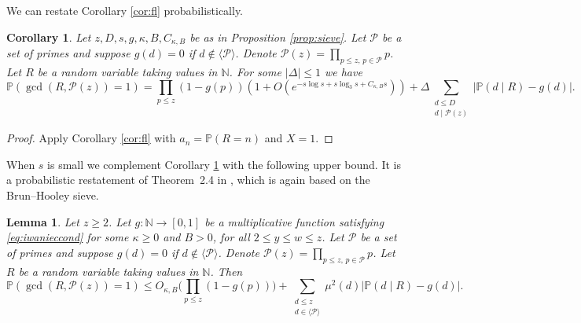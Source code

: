 \documentclass{article}
\theoremstyle{plain}
\newtheorem{lem}[thm]{Lemma}
\newtheorem{cor}[thm]{Corollary}
\theoremstyle{remark}
\newcommand{\PP}{\mathbb{P}}
\newcommand{\NN}{\mathbb{N}}
\newcommand{\Pa}{\mathcal{P}}
\numberwithin{equation}{section}
\begin{document}
We can restate Corollary \ref{cor:fl} probabilistically.
\begin{cor}\label{cor:flprob}
Let $z,D,s,g,\kappa,B,C_{\kappa,B}$ be as in Proposition \ref{prop:sieve}. Let $\Pa$ be a set of primes and suppose $g(d)=0$ if $d\not\in\langle \Pa\rangle$. Denote $\Pa(z) = \prod_{p\le z,\, p \in \Pa}p$. Let $R$ be a  random variable taking values in $\NN$. For some $|\Delta|\le 1$ we have \[ \PP( \gcd(R,\Pa(z))=1) = \prod_{p \le z}(1-g(p)) (1+O(e^{-s\log s + s\log_3 s+C_{\kappa,B}s})) + \Delta \sum_{\substack{d\le D\\d \mid \Pa(z)}} \left|\PP(d\mid R)-g(d)\right|.\]
\end{cor}
\begin{proof}
Apply Corollary \ref{cor:fl} with $a_n = \PP(R=n)$ and $X=1$.
\end{proof}
When $s$ is small we complement Corollary \ref{cor:flprob} with the following upper bound. It is a probabilistic restatement of Theorem~2.4 in \cite{FordNotes}, which is again based on the Brun--Hooley sieve.
\begin{lem}\cite[Theorem 2.4]{FordNotes}\label{lem:upperprob}
Let $z\ge 2$. Let $g\colon \NN\to [0,1]$ be a multiplicative function satisfying \eqref{eq:iwanieccond} for some $\kappa\ge 0$ and $B>0$, for all $2\le y \le w \le z$. Let $\Pa$ be a set of primes and suppose $g(d)=0$ if $d\not\in\langle \Pa\rangle$. Denote $\Pa(z) = \prod_{p\le z,\, p \in \Pa}p$. Let $R$ be a  random variable taking values in $\NN$. Then
\[ \PP( \gcd(R,\Pa(z))=1) \le O_{\kappa,B}\bigg( \prod_{p \le z}(1-g(p))\bigg) + \sum_{\substack{d\le z\\d \in \langle \Pa\rangle}}\mu^2(d) \left|\PP(d\mid R)-g(d)\right|.\]
\end{lem}
\end{document}
